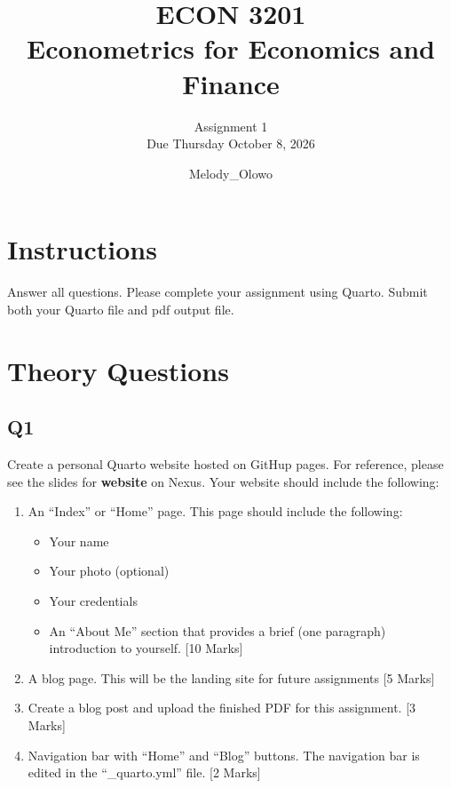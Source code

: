 \documentclass[
]{article}
\title{ECON 3201\\
Econometrics for Economics and Finance}
\subtitle{Assignment 1\\
Due Thursday October 8, 2026}
\author{Melody\_Olowo}
\date{}
\providecommand{\tightlist}{%
  \setlength{\itemsep}{0pt}\setlength{\parskip}{0pt}}
\renewcommand*\contentsname{Table of contents}
\newcommand\contentsname{Table of contents}
\begin{document}
\maketitle

\renewcommand*\contentsname{Table of contents}
{
\setcounter{tocdepth}{3}
\tableofcontents
}

\section*{Instructions}\label{instructions}

Answer all questions. Please complete your assignment using Quarto.
Submit both your Quarto file and pdf output file.

\section{Theory Questions}\label{theory-questions}

\subsection{Q1}\label{q1}

Create a personal Quarto website hosted on GitHup pages. For reference,
please see the slides for \textbf{website} on Nexus. Your website should
include the following:

\begin{enumerate}
\def\labelenumi{\roman{enumi}.}
\tightlist
\item
  An ``Index'' or ``Home'' page. This page should include the following:

  \begin{itemize}
  \tightlist
  \item
    Your name
  \item
    Your photo (optional)
  \item
    Your credentials
  \item
    An ``About Me'' section that provides a brief (one paragraph)
    introduction to yourself. {[}10 Marks{]}
  \end{itemize}
\item
  A blog page. This will be the landing site for future assignments {[}5
  Marks{]}
\item
  Create a blog post and upload the finished PDF for this assignment.
  {[}3 Marks{]}
\item
  Navigation bar with ``Home'' and ``Blog'' buttons. The navigation bar
  is edited in the ``\_quarto.yml'' file. {[}2 Marks{]}
\end{enumerate}
\end{document}

